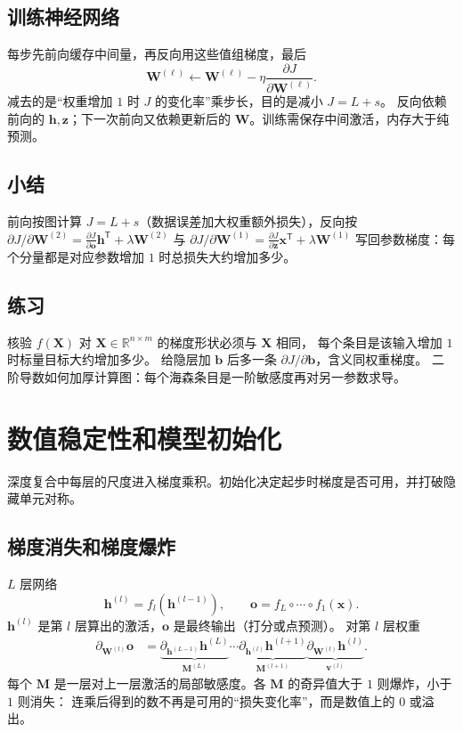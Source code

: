 \subsection{训练神经网络}

每步先前向缓存中间量，再反向用这些值组梯度，最后
\[
\bm{W}^{(\ell)}
\leftarrow
\bm{W}^{(\ell)}-\eta\frac{\partial J}{\partial\bm{W}^{(\ell)}}.
\]
减去的是“权重增加 $1$ 时 $J$ 的变化率”乘步长，目的是减小 $J=L+s$。
反向依赖前向的 $\bm{h},\bm{z}$；下一次前向又依赖更新后的 $\bm{W}$。训练需保存中间激活，内存大于纯预测。

\subsection{小结}

前向按图计算 $J=L+s$（数据误差加大权重额外损失），反向按
$\partial J/\partial\bm{W}^{(2)}=\frac{\partial J}{\partial\bm{o}}\bm{h}^{\mathsf T}+\lambda\bm{W}^{(2)}$
与
$\partial J/\partial\bm{W}^{(1)}=\frac{\partial J}{\partial\bm{z}}\bm{x}^{\mathsf T}+\lambda\bm{W}^{(1)}$
写回参数梯度：每个分量都是对应参数增加 $1$ 时总损失大约增加多少。

\subsection{练习}

核验 $f(\bm{X})$ 对 $\bm{X}\in\mathbb{R}^{n\times m}$ 的梯度形状必须与 $\bm{X}$ 相同，
每个条目是该输入增加 $1$ 时标量目标大约增加多少。
给隐层加 $\bm{b}$ 后多一条 $\partial J/\partial\bm{b}$，含义同权重梯度。
二阶导数如何加厚计算图：每个海森条目是一阶敏感度再对另一参数求导。

\section{数值稳定性和模型初始化}

深度复合中每层的尺度进入梯度乘积。初始化决定起步时梯度是否可用，并打破隐藏单元对称。

\subsection{梯度消失和梯度爆炸}

$L$ 层网络
\[
\bm{h}^{(l)}=f_{l}(\bm{h}^{(l-1)}),
\qquad
\bm{o}=f_{L}\circ\cdots\circ f_{1}(\bm{x}).
\]
$\bm{h}^{(l)}$ 是第 $l$ 层算出的激活，$\bm{o}$ 是最终输出（打分或点预测）。
对第 $l$ 层权重
\begin{align*}
\partial_{\bm{W}^{(l)}}\bm{o}
&=
\underbrace{\partial_{\bm{h}^{(L-1)}}\bm{h}^{(L)}}_{\bm{M}^{(L)}}
\cdots
\underbrace{\partial_{\bm{h}^{(l)}}\bm{h}^{(l+1)}}_{\bm{M}^{(l+1)}}
\underbrace{\partial_{\bm{W}^{(l)}}\bm{h}^{(l)}}_{\bm{v}^{(l)}}.
\end{align*}
每个 $\bm{M}$ 是一层对上一层激活的局部敏感度。各 $\bm{M}$ 的奇异值大于 $1$ 则爆炸，小于 $1$ 则消失：
连乘后得到的数不再是可用的“损失变化率”，而是数值上的 $0$ 或溢出。

